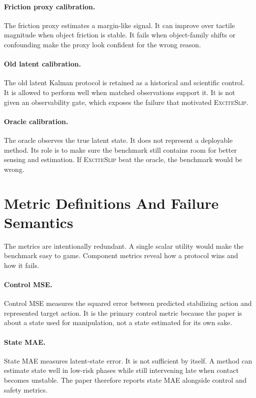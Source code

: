 \documentclass{article}
\newcommand{\method}{\textsc{ExciteSlip}\xspace}
\begin{document}
\paragraph{Friction proxy calibration.}
The friction proxy estimates a margin-like signal. It can improve over tactile magnitude when object friction is stable. It fails when object-family shifts or confounding make the proxy look confident for the wrong reason.

\paragraph{Old latent calibration.}
The old latent Kalman protocol is retained as a historical and scientific control. It is allowed to perform well when matched observations support it. It is not given an observability gate, which exposes the failure that motivated \method.

\paragraph{Oracle calibration.}
The oracle observes the true latent state. It does not represent a deployable method. Its role is to make sure the benchmark still contains room for better sensing and estimation. If \method beat the oracle, the benchmark would be wrong.

\section{Metric Definitions And Failure Semantics}

The metrics are intentionally redundant. A single scalar utility would make the benchmark easy to game. Component metrics reveal how a protocol wins and how it fails.

\paragraph{Control MSE.}
Control MSE measures the squared error between predicted stabilizing action and represented target action. It is the primary control metric because the paper is about a state used for manipulation, not a state estimated for its own sake.

\paragraph{State MAE.}
State MAE measures latent-state error. It is not sufficient by itself. A method can estimate state well in low-risk phases while still intervening late when contact becomes unstable. The paper therefore reports state MAE alongside control and safety metrics.
\end{document}
